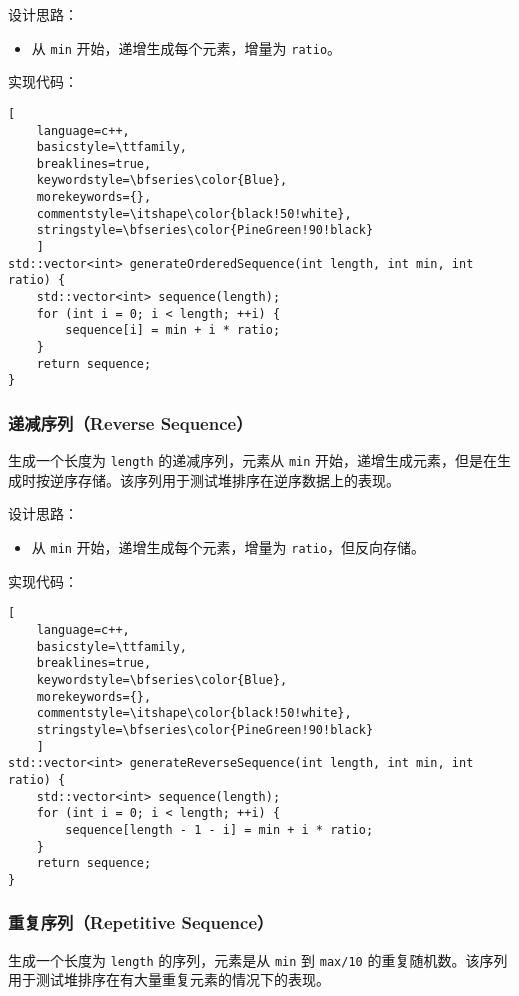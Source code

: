 \documentclass[UTF8]{ctexart}
\begin{document}
设计思路：
\begin{itemize}
    \item 从 \texttt{min} 开始，递增生成每个元素，增量为 \texttt{ratio}。
\end{itemize}

实现代码：
\begin{lstlisting}[ 
    language=c++,
    basicstyle=\ttfamily,
    breaklines=true,
    keywordstyle=\bfseries\color{Blue}, 
    morekeywords={}, 
    commentstyle=\itshape\color{black!50!white},
    stringstyle=\bfseries\color{PineGreen!90!black} 
    ]
std::vector<int> generateOrderedSequence(int length, int min, int ratio) {
    std::vector<int> sequence(length);
    for (int i = 0; i < length; ++i) {
        sequence[i] = min + i * ratio;
    }
    return sequence;
}
\end{lstlisting}

\subsubsection{\textbf{递减序列（Reverse Sequence）}}
生成一个长度为 \texttt{length} 的递减序列，元素从 \texttt{min} 开始，递增生成元素，但是在生成时按逆序存储。该序列用于测试堆排序在逆序数据上的表现。

设计思路：
\begin{itemize}
    \item 从 \texttt{min} 开始，递增生成每个元素，增量为 \texttt{ratio}，但反向存储。
\end{itemize}

实现代码：
\begin{lstlisting}[ 
    language=c++,
    basicstyle=\ttfamily,
    breaklines=true,
    keywordstyle=\bfseries\color{Blue}, 
    morekeywords={}, 
    commentstyle=\itshape\color{black!50!white},
    stringstyle=\bfseries\color{PineGreen!90!black} 
    ]
std::vector<int> generateReverseSequence(int length, int min, int ratio) {
    std::vector<int> sequence(length);
    for (int i = 0; i < length; ++i) {
        sequence[length - 1 - i] = min + i * ratio;
    }
    return sequence;
}
\end{lstlisting}

\subsubsection{\textbf{重复序列（Repetitive Sequence）}}
生成一个长度为 \texttt{length} 的序列，元素是从 \texttt{min} 到 \texttt{max/10} 的重复随机数。该序列用于测试堆排序在有大量重复元素的情况下的表现。
\end{document}
